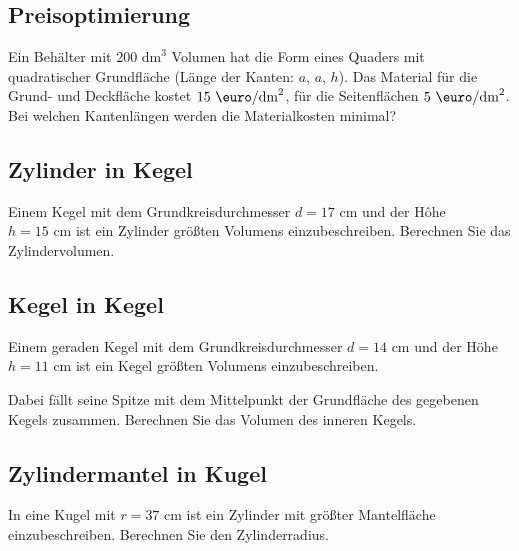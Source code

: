 \subsection{Preisoptimierung}

Ein Behälter mit $200 \text{ dm}^3$ Volumen hat die
Form eines Quaders mit quadratischer Grundfläche (Länge der Kanten: $a$, $a$, $h$). Das Material für die Grund-
und Deckfläche kostet $15 \text{ \euro} / \text{dm}^2$, für die Seitenflächen
$5 \text{ \euro} / \text{dm}^2$. Bei welchen Kantenlängen werden die Materialkosten minimal?






\subsection{Zylinder in Kegel}
Einem Kegel mit dem Grundkreisdurchmesser $d = 17 \text{ cm}$ und der Hôhe $h
= 15 \text{ cm}$ ist ein Zylinder größten Volumens einzubeschreiben. Berechnen Sie das Zylindervolumen.





\subsection{Kegel in Kegel}
Einem geraden Kegel mit dem Grundkreisdurchmesser $d = 14 \text{ cm}$ und der
Höhe $h = 11 \text{ cm}$
ist ein Kegel größten Volumens einzubeschreiben.

Dabei fällt seine Spitze mit dem Mittelpunkt der Grundfläche des
gegebenen Kegels zusammen.
Berechnen Sie das Volumen des inneren Kegels.





\subsection{Zylindermantel in Kugel}
In eine Kugel mit $r = 37 \text{ cm}$ ist ein Zylinder mit größter
Mantelfläche einzubeschreiben.
Berechnen Sie den Zylinderradius.

